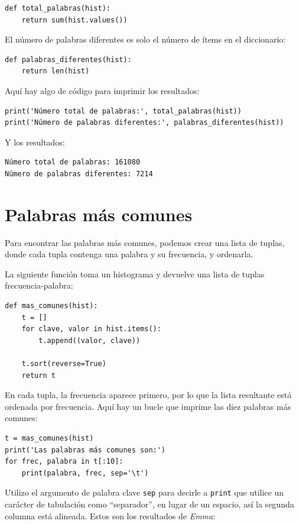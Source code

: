 \documentclass[10pt]{book}
\begin{document}
\begin{verbatim}
def total_palabras(hist):
    return sum(hist.values())
\end{verbatim}
%
El número de palabras diferentes es solo el número de ítems en
el diccionario:

\begin{verbatim}
def palabras_diferentes(hist):
    return len(hist)
\end{verbatim}
%
Aquí hay algo de código para imprimir los resultados:

\begin{verbatim}
print('Número total de palabras:', total_palabras(hist))
print('Número de palabras diferentes:', palabras_diferentes(hist))
\end{verbatim}
%
Y los resultados:

\begin{verbatim}
Número total de palabras: 161080
Número de palabras diferentes: 7214
\end{verbatim}
%

\section{Palabras más comunes}

Para encontrar las palabras más comunes, podemos crear una lista de tuplas,
donde cada tupla contenga una palabra y su frecuencia,
y ordenarla.

La siguiente función toma un histograma y devuelve una lista de
tuplas frecuencia-palabra:

\begin{verbatim}
def mas_comunes(hist):
    t = []
    for clave, valor in hist.items():
        t.append((valor, clave))

    t.sort(reverse=True)
    return t
\end{verbatim}

En cada tupla, la frecuencia aparece primero, por lo que la lista resultante está
ordenada por frecuencia.  Aquí hay un bucle que imprime las diez palabras más
comunes:

\begin{verbatim}
t = mas_comunes(hist)
print('Las palabras más comunes son:')
for frec, palabra in t[:10]:
    print(palabra, frec, sep='\t')
\end{verbatim}
%
Utilizo el argumento de palabra clave {\tt sep} para decirle a {\tt print} que utilice un
carácter de tabulación como ``separador'', en lugar de un espacio, así la segunda
columna está alineada.  Estos son los resultados de {\em Emma}:
\end{document}
